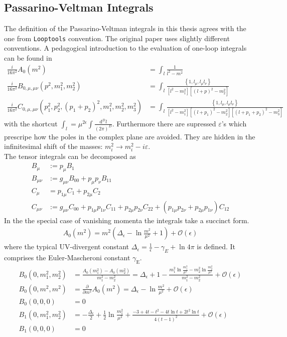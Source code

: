 \subsection{Passarino-Veltman Integrals}\label{sec:Passarino}
The definition of the Passarino-Veltman integrals in this thesis agrees with the one from \texttt{Looptools} \cite{Hahn:1998} convention. The original paper \cite{Passarino:1978jh} uses slightly different conventions. A pedagogical introduction to the evaluation of one-loop integrals can be found in \cite{Ellis:2011cr}
\begin{align}
\frac{i}{16\pi^2} A_0(m^2) &= \int_l \frac{1}{l^2-m^2}\nonumber\\
\frac{i}{16\pi^2} B_{0,\mu,\mu\nu}(p^2,m_1^2,m_2^2) &= \int_l \frac{\left\{1,l_\mu,l_\mu l_\nu \right\}}{[l^2-m_1^2][(l+p)^2-m_2^2]}\\
\frac{i}{16\pi^2} C_{0,\mu,\mu\nu}(p_1^2,p_2^2,(p_1+p_2)^2,m_1^2,m_2^2,m_3^2) &= \int_l \frac{\left\{1,l_\mu,l_\mu l_\nu \right\}}{[l^2-m_1^2][(l+p_1)^2-m_2^2][(l+p_1+p_2)^2-m_3^2]}\nonumber
\end{align}
with the shortcut $\int_l = \mu^{2\epsilon}\int\frac{\mathrm{d}^D l}{(2\pi)^D}$. Furthermore there are supressed $\varepsilon$'s which prescripe how the poles in the complex plane are avoided. They are hidden in the infinitesimal shift of the masses: $m_i^2 \to m_i^2 - i \varepsilon$.\\
The tensor integrals can be decomposed as
\begin{align}
B_\mu &:= p_\mu B_1\nonumber\\
B_{\mu\nu} &:= g_{\mu\nu}B_{00} + p_\mu p_\nu B_{11}\nonumber\\
C_\mu &= p_{1\mu}C_1 + p_{2\mu}C_2\\
C_{\mu\nu} &:= g_{\mu\nu}C_{00} + p_{1\mu}p_{1\nu}C_{11} + p_{2\mu}p_{2\nu}C_{22} + (p_{1\mu}p_{2\nu} + p_{2\mu}p_{1\nu})C_{12}\nonumber
\end{align}
In the the special case of vanishing momenta the integrals take a succinct form. %
\begin{align}
A_0(m^2) = m^2\left( \Delta_\epsilon -\ln \frac{m^2}{\mu^2} + 1 \right) + \mathcal{O}(\epsilon)
\end{align}
where the typical UV-divergent constant $\Delta_\epsilon = \frac{1}{\epsilon} - \gamma_E+\ln 4\pi$ is defined. It comprises the Euler-Mascheroni constant $\gamma_{\mathrm{E}}$.
\begin{align}
B_0(0,m_1^2,m_2^2) &= \frac{A_0(m_1^2)-A_0(m_2^2)}{m_1^2-m_2^2} = \Delta_\epsilon + 1 -\frac{m_1^2\ln \frac{m_1^2}{\mu^2}-m_2^2\ln \frac{m_2^2}{\mu^2}}{m_1^2-m_2^2} + \mathcal{O}(\epsilon)\\
B_0(0,m^2,m^2) &= \frac{\partial}{\partial m^2} A_0(m^2) = \Delta_\epsilon -\ln \frac{m^2}{\mu^2} + \mathcal{O}(\epsilon)\\
B_0(0,0,0) &= 0\\
B_1(0,m_1^2,m_2^2) &= -\frac{\Delta_\epsilon}{2} + \frac{1}{2}\ln \frac{m_1^2}{\mu^2} + \frac{-3+4t-t^2-4t \ln t +2t^2 \ln t}{4(t-1)^2} + \mathcal{O}(\epsilon)\label{eq:B1}\\
B_1(0,0,0) &= 0
\end{align}
